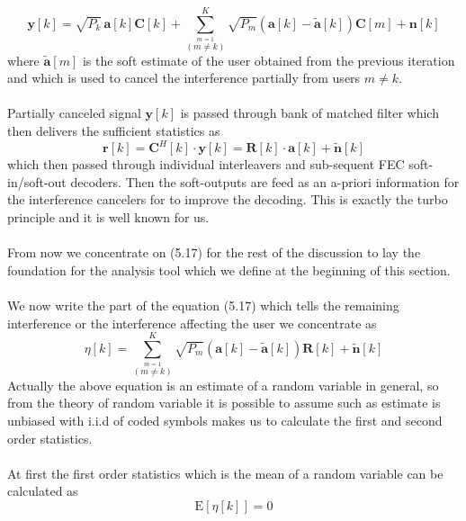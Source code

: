 \begin{equation}
\mathrm{\mathbf{y}}[k]=\sqrt{P_k}\,\mathrm{\mathbf{a}}[k]\mathrm{\mathbf{C}}[k]+\sum\limits_{\stackrel{m=1}{(m\neq k)}}^K\sqrt{P_m}\left(\mathrm{\mathbf{a}}[k]-\mathrm{\mathbf{\tilde{a}}}[k]\right)\mathrm{\mathbf{C}}[m]+\mathrm{\mathbf{n}}[k]
\end{equation}
where $\mathrm{\mathbf{\tilde{a}}}[m]$ is the soft estimate of the user obtained from the previous iteration and which is used to cancel the interference partially from users $m\neq k$.\\ \\
Partially canceled signal $\mathrm{\mathbf{y}}[k]$ is passed through bank of matched filter which then delivers the sufficient statistics as
\begin{equation}
\mathrm{\mathbf{r}}[k]=\mathrm{\mathbf{C}}^H[k]\cdot\mathrm{\mathbf{y}}[k]=\mathrm{\mathbf{R}}[k]\cdot\mathrm{\mathbf{a}}[k]+\mathrm{\mathbf{\tilde{n}}}[k]
\end{equation}
which then passed through individual interleavers and sub-sequent FEC soft-in/soft-out decoders. Then the soft-outputs are feed as an a-priori information for the interference cancelers for to improve the decoding. This is exactly the turbo principle and it is well known for us.\\ \\
From now we concentrate on (5.17) for the rest of the discussion to lay the foundation for the analysis tool which we define at the beginning of this section.\\ \\
We now write the part of the equation (5.17) which tells the remaining interference or the interference affecting the user we concentrate as
\begin{equation}
\eta[k]=\sum\limits_{\stackrel{m=1}{(m\neq k)}}^{K}\sqrt{P_m}\left(\mathrm{\mathbf{a}}[k]-\mathrm{\mathbf{\tilde{a}}}[k]\right)\mathrm{\mathbf{R}}[k]+\mathrm{\mathbf{\tilde{n}}}[k]
\end{equation}
Actually the above equation is an estimate of a random variable in general, so from the theory of random variable it is possible to assume such as estimate is unbiased with i.i.d of coded symbols makes us to calculate the first and second order statistics. \\ \\
At first the first order statistics which is the mean of a random variable can be calculated as
\begin{equation}
\mathrm{E}[\eta[k]]=0
\end{equation}
